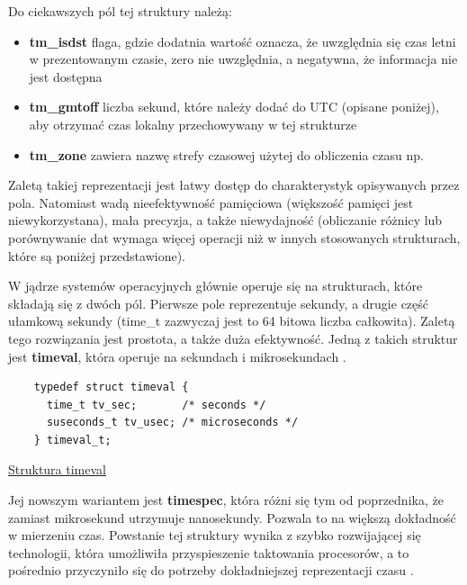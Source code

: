 \documentclass[shortabstract]{iithesis}
\theoremstyle{definition} \newtheorem*{definition}{Definicja}
\theoremstyle{definition} \newtheorem*{example}{Przykład}
\theoremstyle{definition} \newtheorem*{remark}{Uwaga}
\newenvironment{longlisting}{\captionsetup{type=listing}}{}
\begin{document}
Do ciekawszych pól tej struktury należą:

\begin{itemize}
    \item \textbf{tm\_isdst} flaga, gdzie dodatnia wartość oznacza, że uwzględnia się czas letni w prezentowanym czasie, zero nie uwzględnia, a negatywna, że informacja nie jest dostępna
    \item \textbf{tm\_gmtoff} liczba sekund, które należy dodać do UTC (opisane poniżej), aby otrzymać czas lokalny przechowywany w tej strukturze
    \item \textbf{tm\_zone} zawiera nazwę strefy czasowej użytej do obliczenia czasu np. 
\end{itemize}

Zaletą takiej reprezentacji jest łatwy dostęp do charakterystyk opisywanych przez pola. Natomiast wadą nieefektywność pamięciowa (większość pamięci jest niewykorzystana), mała precyzja, a także niewydajność (obliczanie różnicy lub porównywanie dat wymaga więcej operacji niż w innych stosowanych strukturach, które są poniżej przedstawione).

W jądrze systemów operacyjnych głównie operuje się na strukturach, które składają się z dwóch pól. Pierwsze pole reprezentuje sekundy, a drugie część ułamkową sekundy (time\_t zazwyczaj jest to 64 bitowa liczba całkowita). Zaletą tego rozwiązania jest prostota, a także duża efektywność. Jedną z takich struktur jest \textbf{timeval}, która operuje na sekundach i mikrosekundach \cite{bib:time-types}.

\begin{longlisting}
  \begin{verbatim}
    typedef struct timeval {
      time_t tv_sec;       /* seconds */
      suseconds_t tv_usec; /* microseconds */
    } timeval_t;
  \end{verbatim}
  \caption{\href{https://mimiker.ii.uni.wroc.pl/source/xref/mimiker/include/sys/time.h?r=9505a819\#22}{Struktura timeval}}
  \label{lst:structtv}
\end{longlisting}

Jej nowszym wariantem jest \textbf{timespec}, która różni się tym od poprzednika, że zamiast mikrosekund utrzymuje nanosekundy. Pozwala to na większą dokładność w mierzeniu czas. Powstanie tej struktury wynika z szybko rozwijającej się technologii, która umożliwiła przyspieszenie taktowania procesorów, a to pośrednio przyczyniło się do potrzeby dokładniejszej reprezentacji czasu \cite{bib:time-types}.
\end{document}
